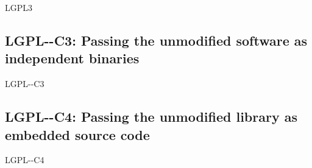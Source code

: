 \begin{license}{LGPL3}
\subsection{LGPL-\ver-C3: Passing the unmodified software as independent binaries}
\begin{lsuc}{LGPL-\ver-C3} 

  \useCaseThree

  \begin{lsucrequires}
    \lsucmandatory{\keepLicensingElements}
    \lsucmandatory{\lgplthreeEnsureCopyrightNoticeBinary}
    \lsucmandatory{\giveLicense}\passingFilesCorrectly
    \lsucmandatory{\makeUnmodifiedSourceAvailable}
    \lsucmandatory{\describeHowToGetSource}
    \lsucmandatory{\retainCopyrightNotices}
    \lsucoptional{\addToDocumentation}
  \end{lsucrequires}

  \begin{lsucprohibits}
    \lsucitem{\noPatentLitigation}
  \end{lsucprohibits}
\end{lsuc}

\subsection{LGPL-\ver-C4: Passing the unmodified library as embedded source code}
\begin{lsuc}{LGPL-\ver-C4}

  \useCaseFour

  \begin{lsucrequires}
    \lsucmandatory{\keepLicensingElements}
    \lsucmandatory{\lgplthreeEnsureCopyrightNoticeSource}
    \lsucmandatory{\giveLicense}\passingFilesCorrectly
    \lsucmandatory{\retainCopyrightNotices}
    \lsucmandatory{\addToCopyrightDialogLibWeak}
    \lsucoptional{\addToDocumentation}
  \end{lsucrequires}

  \begin{lsucprohibits}
    \lsucitem{\noPatentLitigation}
  \end{lsucprohibits}
\end{lsuc}


\end{license}
